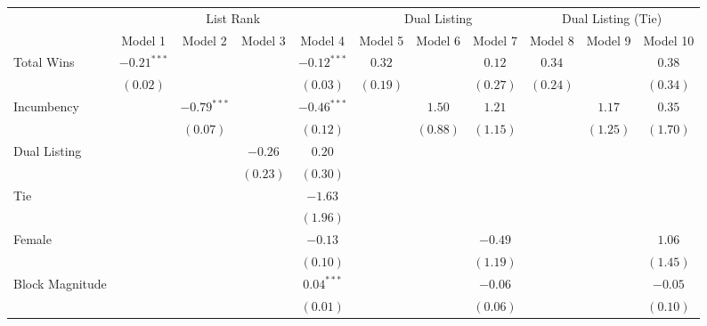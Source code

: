 
\begin{table}
\begin{center}
\begin{tabular}{l c c c c c c c c c c}
\hline
 & \multicolumn{4}{c}{List Rank} & \multicolumn{3}{c}{Dual Listing} & \multicolumn{3}{c}{Dual Listing (Tie)} \\
\cline{2-5} \cline{6-8} \cline{9-11}
 & Model 1 & Model 2 & Model 3 & Model 4 & Model 5 & Model 6 & Model 7 & Model 8 & Model 9 & Model 10 \\
\hline
Total Wins       & $-0.21^{***}$ &               &           & $-0.12^{***}$ & $0.32$   &          & $0.12$   & $0.34$   &          & $0.38$   \\
                 & $(0.02)$      &               &           & $(0.03)$      & $(0.19)$ &          & $(0.27)$ & $(0.24)$ &          & $(0.34)$ \\
Incumbency       &               & $-0.79^{***}$ &           & $-0.46^{***}$ &          & $1.50$   & $1.21$   &          & $1.17$   & $0.35$   \\
                 &               & $(0.07)$      &           & $(0.12)$      &          & $(0.88)$ & $(1.15)$ &          & $(1.25)$ & $(1.70)$ \\
Dual Listing     &               &               & $-0.26$   & $0.20$        &          &          &          &          &          &          \\
                 &               &               & $(0.23)$  & $(0.30)$      &          &          &          &          &          &          \\
Tie              &               &               &           & $-1.63$       &          &          &          &          &          &          \\
                 &               &               &           & $(1.96)$      &          &          &          &          &          &          \\
Female           &               &               &           & $-0.13$       &          &          & $-0.49$  &          &          & $1.06$   \\
                 &               &               &           & $(0.10)$      &          &          & $(1.19)$ &          &          & $(1.45)$ \\
Block Magnitude  &               &               &           & $0.04^{***}$  &          &          & $-0.06$  &          &          & $-0.05$  \\
                 &               &               &           & $(0.01)$      &          &          & $(0.06)$ &          &          & $(0.10)$ \\

\end{tabular}
\end{center}
\end{table}
